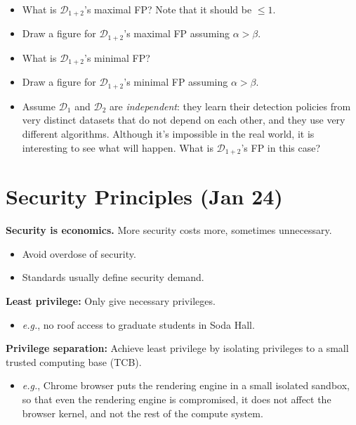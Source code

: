 \documentclass{article}
\newcommand{\parhead}[1]{\noindent \textbf{#1}}
\begin{document}
\begin{itemize}
    \item What is $\mathcal{D}_{1+2}$'s maximal FP? Note that it should be $\leq 1$.
    \vspace{4em}
    
    \item Draw a figure for $\mathcal{D}_{1+2}$'s maximal FP assuming $\alpha>\beta$.
    \vspace{4em}
     
    \item What is $\mathcal{D}_{1+2}$'s minimal FP?
    \vspace{4em}
    
    \item Draw a figure for $\mathcal{D}_{1+2}$'s minimal FP assuming $\alpha>\beta$.
    \vspace{4em}
    
    \item Assume $\mathcal{D}_1$ and $\mathcal{D}_2$ are \emph{independent}: they learn their detection policies from very distinct datasets that do not depend on each other, and they use very different algorithms. Although it's impossible in the real world, it is interesting to see what will happen. What is $\mathcal{D}_{1+2}$'s FP in this case?
    \vspace{4em}
\end{itemize}

\clearpage
\section{Security Principles (Jan 24)}

\parhead{Security is economics.} More security costs more, sometimes unnecessary. 
\begin{itemize}
    \item Avoid overdose of security.
    \item Standards usually define security demand.
\end{itemize}

\smallskip\parhead{Least privilege:} Only give necessary privileges.
\begin{itemize}
    \item \emph{e.g.}, no roof access to graduate students in Soda Hall.
\end{itemize}

\smallskip\parhead{Privilege separation:} Achieve least privilege by isolating privileges to a small trusted computing base (TCB).
\begin{itemize}
    \item \emph{e.g.}, Chrome browser puts the rendering engine in a small isolated sandbox, so that even the rendering engine is compromised, it does not affect the browser kernel, and not the rest of the compute system.
\end{itemize}
\end{document}
